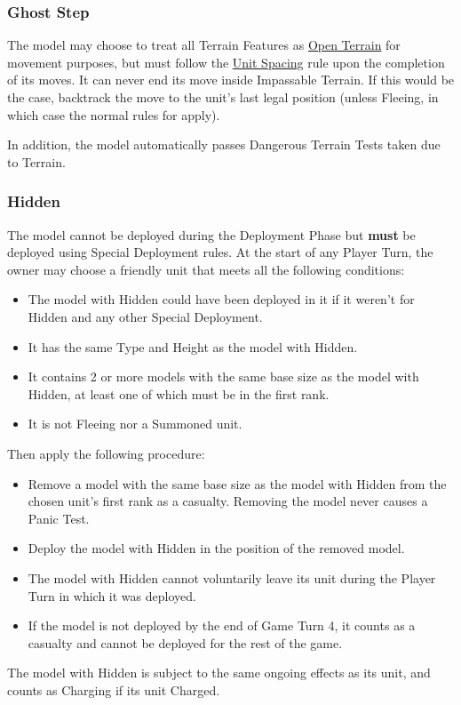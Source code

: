 \subsubsection{Ghost Step}
\idx[main=y]{\ghoststep}\label{ghost_step}

The model may choose to treat all Terrain Features as \hyperref[open_terrain]{Open Terrain} for movement purposes, but must follow the \hyperref[unit_spacing]{Unit Spacing} rule upon the completion of its moves. It can never end its move inside Impassable Terrain. If this would be the case, backtrack the move to the unit's last legal position (unless Fleeing, in which case the normal rules for  apply).

In addition, the model automatically passes Dangerous Terrain Tests taken due to Terrain.

\columnbreak

\subsubsection{Hidden}
\idx[main=y]{\hidden}\label{hidden}

The model cannot be deployed during the Deployment Phase but \textbf{must} be deployed using Special Deployment rules.  At the start of any Player Turn, the owner may choose a friendly unit that meets all the following conditions:
\begin{itemize}
	\item The model with Hidden could have  been deployed in it if it weren't for Hidden and any other Special Deployment.
	\item It has the same Type and Height as the model with Hidden.
	\item It contains 2 or more \rnf{} models with the same base size as the model with Hidden, at least one of which must be in the first rank.
	\item It is not Fleeing nor a Summoned unit.
\end{itemize}
Then apply the following procedure:
\begin{itemize}
	\item Remove a \rnf{} model with the same base size as the model with Hidden from the chosen unit’s first rank as a casualty. Removing the model never causes a Panic Test.
	\item Deploy the model with Hidden in the position of the removed model.
	\item The model with Hidden cannot voluntarily leave its unit during the Player Turn in which it was deployed.
	\item If the model is not deployed by the end of Game Turn 4, it counts as a casualty and cannot be deployed for the rest of the game.
\end{itemize}
The model with Hidden is subject to the same ongoing effects as its unit, and counts as Charging if its unit Charged.

